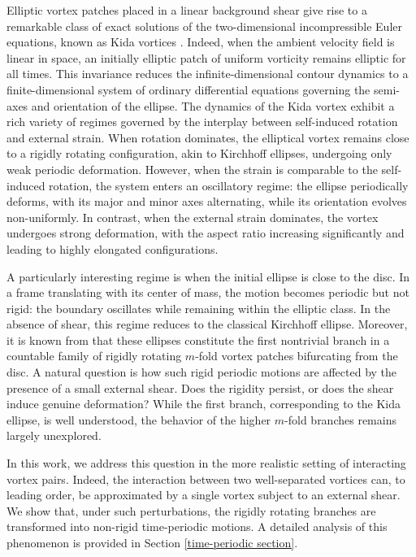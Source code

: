 \documentclass[a4paper,reqno,10pt]{article}
\begin{document}
Elliptic vortex patches placed in a linear background shear give rise to a remarkable class of exact solutions of the two-dimensional incompressible Euler equations, known as Kida vortices \cite{Kida}. Indeed,  when the ambient velocity field is linear in space, an initially elliptic patch of uniform vorticity remains elliptic for all times. This invariance reduces the infinite-dimensional contour dynamics to a finite-dimensional system of ordinary differential equations governing the semi-axes and orientation of the ellipse. 
The dynamics of the Kida vortex exhibit a rich variety of regimes governed by the interplay between self-induced rotation and external strain. When rotation dominates, the elliptical vortex remains close to a rigidly rotating configuration, akin to Kirchhoff ellipses, undergoing only weak periodic deformation. However, when the strain is comparable to the self-induced rotation, the system enters an oscillatory regime: the ellipse periodically deforms, with its major and minor axes alternating, while its orientation evolves non-uniformly. In contrast, when the external strain dominates, the vortex undergoes strong deformation, with the aspect ratio increasing significantly and leading to highly elongated configurations.

A particularly interesting regime  is  when the initial ellipse is close to the disc. In a frame translating with its center of mass, the motion becomes periodic but not rigid: the boundary oscillates while remaining within the elliptic class. In the absence of shear, this regime reduces to the classical Kirchhoff ellipse. Moreover, it is known from \cite{Burbea,DZ,HMV} that these ellipses constitute the first nontrivial branch in a countable family of rigidly rotating $m$-fold vortex patches bifurcating from the disc.
%
A natural question is how such rigid periodic motions are affected by the presence of a small external shear. Does the rigidity persist, or does the shear induce genuine deformation? While the first branch, corresponding to the Kida ellipse, is well understood, the behavior of the higher $m$-fold branches remains largely unexplored.

In this work, we address this question in the more realistic setting of interacting vortex pairs. Indeed, the interaction between two well-separated vortices can, to leading order, be approximated by a single vortex subject to an external shear. We show that, under such perturbations, the rigidly rotating branches are transformed into non-rigid time-periodic motions. A detailed analysis of this phenomenon is provided in Section \ref{time-periodic section}.
\end{document}
